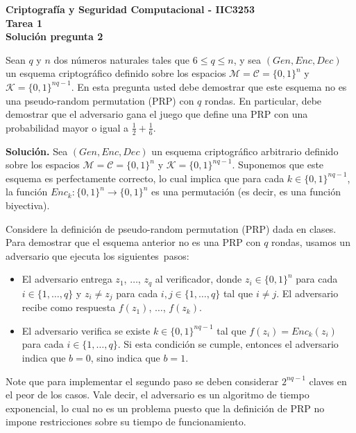 \documentclass[11pt]{article}
\begin{document}
\begin{center}
  \bf Criptografía y Seguridad Computacional - IIC3253\\
  \bf Tarea 1\\
  \bf Solución pregunta 2
\end{center}

\bigskip

\noindent
Sean $q$ y $n$ dos números naturales tales que $6 \leq q \leq n$, y
sea $(\textit{Gen}, \textit{Enc}, \textit{Dec})$ un esquema
criptográfico definido sobre los espacios $\mathcal{M} = \mathcal{C} =
\{0,1\}^n$ y $\mathcal{K} = \{0, 1\}^{nq - 1}$. En esta pregunta usted
debe demostrar que este esquema no es una pseudo-random permutation
(PRP) con $q$ rondas. En particular, debe demostrar que el adversario
gana el juego que define una PRP con una probabilidad mayor o igual a
$\frac{1}{2} + \frac{1}{6}$.

\bigskip

\noindent
{\bf Solución.} Sea $(\textit{Gen}, \textit{Enc}, \textit{Dec})$ un
esquema criptográfico arbitrario definido sobre los espacios
$\mathcal{M} = \mathcal{C} = \{0,1\}^n$ y $\mathcal{K} = \{0, 1\}^{nq
  - 1}$. Suponemos que este esquema es perfectamente correcto, lo cual
implica que para cada $k \in \{0, 1\}^{nq - 1}$, la función
$\textit{Enc}_k : \{0,1\}^n \to \{0,1\}^n$ es una permutación (es
decir, es una función biyectiva).

Considere la definición de pseudo-random permutation (PRP) dada en
clases. Para demostrar que el esquema anterior no es una PRP con $q$
rondas, usamos un adversario que ejecuta los sigui\-entes~pasos:
\begin{itemize}
  \item El adversario entrega $z_1$, $\ldots$, $z_q$ al verificador,
    donde $z_i \in \{0,1\}^n$ para cada $i \in \{1, \ldots, q\}$ y
    $z_i \neq z_j$ para cada $i,j \in \{1, \ldots, q\}$ tal que $i \neq
    j$. El adversario recibe como respuesta $f(z_1)$,
    $\ldots$, $f(z_k)$.

  \item El adversario verifica se existe $k \in \{0, 1\}^{nq - 1}$
    tal que $f(z_i) = \textit{Enc}_{k}(z_i)$ para cada $i \in \{1,
    \ldots, q\}$.  Si esta condición se cumple, entonces el adversario
    indica que $b=0$, sino indica que $b=1$.
\end{itemize}
Note que para implementar el segundo paso se deben considerar
$2^{nq-1}$ claves en el peor de los casos. Vale decir, el
adversario es un algoritmo de tiempo exponencial, lo cual no es un
problema puesto que la definición de PRP no impone restricciones sobre
su tiempo de funcionamiento.
\end{document}
